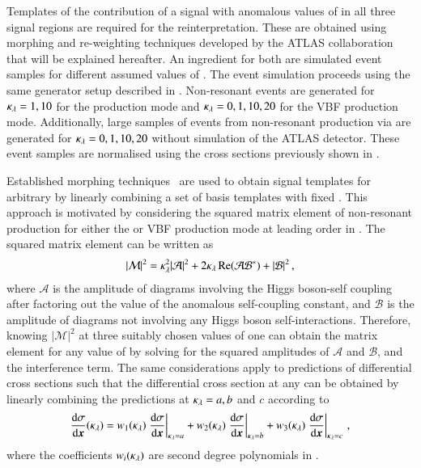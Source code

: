 Templates of the contribution of a signal with anomalous values of
\klambda in all three signal regions are required for the
reinterpretation. These are obtained using morphing and re-weighting
techniques developed by the ATLAS collaboration that will be explained
hereafter. An ingredient for both are simulated event samples for
different assumed values of \klambda. The event simulation proceeds
using the same generator setup described in
. Non-resonant \HH events are generated
for $\kappa_{\lambda} = 1, 10$ for the \ggF production mode and
$\kappa_{\lambda} = 0, 1, 10, 20$ for the VBF production mode. Additionally,
large samples of events from non-resonant \HH production via \ggF are
generated for $\kappa_{\lambda} = 0, 1, 10, 20$ without simulation of the
ATLAS detector. These event samples are normalised using the cross
sections previously shown in .

Established morphing techniques~\cite{ATL-PHYS-PUB-2015-047} are used
to obtain signal templates for arbitrary \klambda by linearly
combining a set of basis templates with fixed \klambda. This approach
is motivated by considering the squared matrix element of non-resonant
\HH production for either the \ggF or VBF production mode at leading
order in \klambda. The squared matrix element can be written as
\begin{align*}
  |\mathcal{M}|^2 = \kappa_{\lambda}^2 |\mathcal{A}|^2 + 2 \kappa_{\lambda} \operatorname{Re}(\mathcal{A} \mathcal{B}^*) + |\mathcal{B}|^2 \,\text{,}
\end{align*}
where $\mathcal{A}$ is the amplitude of diagrams involving the Higgs
boson-self coupling after factoring out the value of the anomalous
self-coupling constant, and $\mathcal{B}$ is the amplitude of diagrams
not involving any Higgs boson self-interactions. Therefore, knowing
$|\mathcal{M}|^2$ at three suitably chosen values of \klambda one can
obtain the matrix element for any value of \klambda by solving for the
squared amplitudes of $\mathcal{A}$ and $\mathcal{B}$, and the
interference term. The same considerations apply to predictions of
differential cross sections such that the differential cross section
at any \klambda can be obtained by linearly combining the predictions
at $\kappa_{\lambda} = a, b$ and $c$ according to
\begin{align*}
  \frac{\mathrm{d}\sigma}{\mathrm{d}\myvec{x}}(\klambda)
  = w_1(\klambda) \left. \frac{\mathrm{d}\sigma}{\mathrm{d}\myvec{x}} \right|_{\klambda = a}
  + w_2(\klambda) \left. \frac{\mathrm{d}\sigma}{\mathrm{d}\myvec{x}} \right|_{\klambda = b}
  + w_3(\klambda) \left. \frac{\mathrm{d}\sigma}{\mathrm{d}\myvec{x}} \right|_{\klambda = c} \,\text{,}
\end{align*}
where the coefficients $w_i(\kappa_{\lambda})$ are second degree polynomials
in \klambda.

